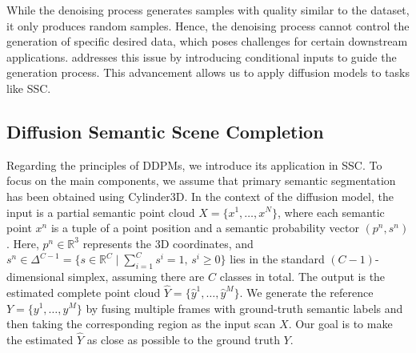 \documentclass[conference]{IEEEtran}
\begin{document}
While the denoising process generates samples with quality similar to the dataset, it only produces random samples.
Hence, the denoising process cannot control the generation of specific desired data, which poses challenges for certain downstream applications.
\cite{aq} addresses this issue by introducing conditional inputs to guide the generation process.
This advancement allows us to apply diffusion models to tasks like SSC.

\subsection{Diffusion Semantic Scene Completion}

Regarding the principles of DDPMs, we introduce its application in SSC.
To focus on the main components, we assume that primary semantic segmentation has been obtained using Cylinder3D.
In the context of the diffusion model, the input is a partial semantic point cloud $X = \{x^1, \ldots, x^N\}$, where each semantic point $x^n$ is a tuple of a point position and a semantic probability vector $(p^n, s^n)$.
Here, $p^n \in \mathbb{R}^3$ represents the 3D coordinates, and $s^n \in \Delta^{C-1} = \{s \in \mathbb{R}^C \mid \sum_{i=1}^C s^i = 1,\, s^i \geq 0\}$ lies in the standard $(C-1)$-dimensional simplex, assuming there are $C$ classes in total.
The output is the estimated complete point cloud $\hat{Y} = \{\hat{y}^1, \ldots, \hat{y}^M\}$.
We generate the reference $Y = \{y^1, \ldots, y^M\}$ by fusing multiple frames with ground-truth semantic labels and then taking the corresponding region as the input scan $X$.
Our goal is to make the estimated $\hat{Y}$ as close as possible to the ground truth $Y$.
\end{document}
